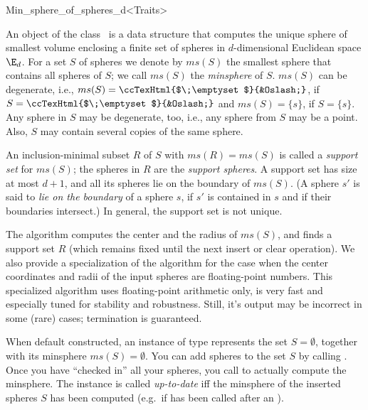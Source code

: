 
\begin{ccRefClass}{Min_sphere_of_spheres_d<Traits>}

\ccDefinition

An object of the class \ccRefName\ is a data structure that computes
the unique sphere of smallest volume enclosing a finite set of spheres
in $d$-dimensional Euclidean space $\E_d$.  For a set $S$ of spheres
we denote by $ms(S)$ the smallest sphere that contains all spheres of
$S$; we call $ms(S)$ the \emph{minsphere} of $S$. $ms(S)$ can be
degenerate, i.e., $ms(S)=\mbox{\ccTexHtml{$\;\emptyset$}{&Oslash;}}$,
if $S=\mbox{\ccTexHtml{$\;\emptyset$}{&Oslash;}}$ and $ms(S)=\{s\}$,
if $S=\{s\}$.  Any sphere in $S$ may be degenerate, too, i.e., any
sphere from $S$ may be a point.  Also, $S$ may contain several
copies of the same sphere.

An inclusion-minimal subset $R$ of $S$ with $ms(R)=ms(S)$ is called a
\emph{support set} for $ms(S)$; the spheres in $R$ are the
\emph{support spheres}.  A support set has size at most $d+1$, and all
its spheres lie on the boundary of $ms(S)$. (A sphere $s'$ is said to
\emph{lie on the boundary} of a sphere $s$, if $s'$ is contained in $s$
and if their boundaries intersect.)  In general, the support set is
not unique.

The algorithm computes the center and the radius of $ms(S)$, and finds
a support set $R$ (which remains fixed until the next insert or clear
operation).  We also provide a specialization of the algorithm for the
case when the center coordinates and radii of the input spheres are
floating-point numbers.  This specialized algorithm uses
floating-point arithmetic only, is very fast and especially tuned for
stability and robustness.  Still, it's output may be incorrect in some
(rare) cases; termination is guaranteed.

When default constructed, an instance of type
 represents the set
$S=\emptyset$, together with its minsphere $ms(S)=\emptyset$.  You can
add spheres to the set $S$ by calling .  Once you have
``checked in'' all your spheres, you call  to actually
compute the minsphere.  The instance is called \emph{up-to-date} iff
the minsphere of the inserted spheres $S$ has been computed (e.g.\ if
 has been called after an ).


\end{ccRefClass}

